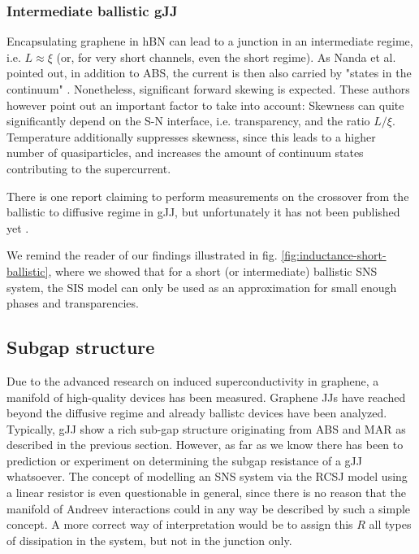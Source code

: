 \subsubsection{Intermediate ballistic gJJ}
Encapsulating graphene in hBN can lead to a junction in an intermediate regime, i.e. $L\approx\xi$ (or, for very short channels, even the short regime). As Nanda et al. pointed out, in addition to ABS, the current is then also carried by "states in the continuum" \cite{nanda_current-phase_2017}. Nonetheless, significant forward skewing is expected. These authors however point out an important factor to take into account: Skewness can quite significantly depend on the S-N interface, i.e. transparency, and the ratio $L/\xi$. Temperature additionally suppresses skewness, since this leads to a higher number of quasiparticles, and increases the amount of continuum states contributing to the supercurrent.

There is one report claiming to perform measurements on the crossover from the ballistic to diffusive regime in gJJ, but unfortunately it has not been published yet \cite{kratz_ballistic_2016}.

We remind the reader of our findings illustrated in fig. \ref{fig:inductance-short-ballistic}, where we showed that for a short (or intermediate) ballistic SNS system, the SIS model can only be used as an approximation for small enough phases and transparencies.

\subsection{Subgap structure}
Due to the advanced research on induced superconductivity in graphene, a manifold of high-quality devices has been measured. Graphene JJs have reached beyond the diffusive regime and already ballistc devices have been analyzed. Typically, gJJ show a rich sub-gap structure originating from ABS and MAR as described in the previous section. However, as far as we know there has been to prediction or experiment on determining the subgap resistance of a gJJ whatsoever. The concept of modelling an SNS system via the RCSJ model using a linear resistor is even questionable in general, since there is no reason that the manifold of Andreev interactions could in any way be described by such a simple concept. A more correct way of interpretation would be to assign this $R$ all types of dissipation in the system, but not in the junction only.

